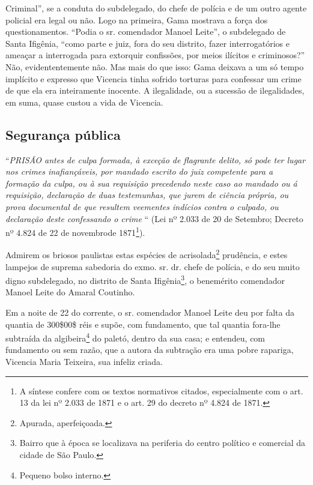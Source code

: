 {\begin{didascalia}
{Criminal'', se a conduta do subdelegado, do chefe de polícia e de um
outro agente policial era legal ou não. Logo na primeira, Gama mostrava
a força dos questionamentos. ``Podia o sr. comendador Manoel Leite'', o
subdelegado de Santa Ifigênia, ``como parte e juiz, fora do seu distrito,
fazer interrogatórios e ameaçar a interrogada para extorquir confissões,
por meios ilícitos e criminosos?'' Não, evidententemente não. Mas mais do
que isso: Gama deixava a um só tempo implícito e expresso que Vicencia
tinha sofrido torturas para confessar um crime de que ela era
inteiramente inocente. A ilegalidade, ou a sucessão de ilegalidades, em
suma, quase custou a vida de Vicencia.}
\end{didascalia}

\asterisc{}

\subsection{Segurança pública}

``\emph{PRISÃO antes de culpa formada, à exceção de flagrante delito, só
pode ter lugar nos crimes inafiançáveis, por mandado escrito do juiz
competente para a formação da culpa, ou à sua requisição precedendo
neste caso ao mandado ou á requisição, declaração de duas testemunhas,
que jurem de ciência própria, ou prova documental de que resultem
veementes indícios contra o culpado, ou declaração deste confessando o
crime} `` (Lei nº 2.033 de 20 de Setembro; Decreto nº 4.824 de 22 de
novembrode 1871\footnote{ A síntese confere com os textos normativos
  citados, especialmente com o art. 13 da lei nº 2.033 de 1871 e o art.
  29 do decreto nº 4.824 de 1871.}).

Admirem os briosos paulistas estas espécies de acrisolada\footnote{
  Apurada, aperfeiçoada.} prudência, e estes lampejos de suprema
sabedoria do exmo. sr. dr. chefe de polícia, e do seu muito digno
subdelegado, no distrito de Santa Ifigênia\footnote{ Bairro que à época
  se localizava na periferia do centro político e comercial da cidade de
  São Paulo.}, o benemérito comendador Manoel Leite do Amaral Coutinho.

Em a noite de 22 do corrente, o sr. comendador Manoel Leite deu por
falta da quantia de 300\$00\$ réis e supõe, com fundamento, que tal
quantia fora-lhe subtraída da algibeira\footnote{ Pequeno bolso
  interno.} do paletó, dentro da sua casa; e entendeu, com fundamento ou
sem razão, que a autora da subtração era uma pobre rapariga, Vicencia
Maria Teixeira, sua infeliz criada.

}
